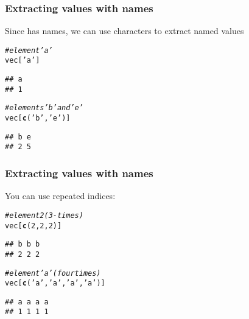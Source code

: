 \documentclass[12pt]{beamer}\usepackage[]{graphicx}\usepackage[]{color}
\makeatletter
\newcommand{\hlnum}[1]{\textcolor[rgb]{0.686,0.059,0.569}{#1}}%
\newcommand{\hlstr}[1]{\textcolor[rgb]{0.192,0.494,0.8}{#1}}%
\newcommand{\hlcom}[1]{\textcolor[rgb]{0.678,0.584,0.686}{\textit{#1}}}%
\newcommand{\hlstd}[1]{\textcolor[rgb]{0.345,0.345,0.345}{#1}}%
\newcommand{\hlkwd}[1]{\textcolor[rgb]{0.737,0.353,0.396}{\textbf{#1}}}%
\newenvironment{kframe}{%
 \def\at@end@of@kframe{}%
 \ifinner\ifhmode%
  \def\at@end@of@kframe{\end{minipage}}%
  \begin{minipage}{\columnwidth}%
 \fi\fi%
 \def\FrameCommand##1{\hskip\@totalleftmargin \hskip-\fboxsep
 \colorbox{shadecolor}{##1}\hskip-\fboxsep
     \hskip-\linewidth \hskip-\@totalleftmargin \hskip\columnwidth}%
 \MakeFramed {\advance\hsize-\width
   \@totalleftmargin\z@ \linewidth\hsize
   \@setminipage}}%
 {\par\unskip\endMakeFramed%
 \at@end@of@kframe}
\newenvironment{knitrout}{}{} %
\makeatother
\begin{document}

\begin{frame}[fragile]
\frametitle{Extracting values with names}

Since  has names, we can use characters to extract named values
\begin{knitrout}\footnotesize
{}\color{fgcolor}\begin{kframe}
\begin{alltt}
\hlcom{# element 'a'}
\hlstd{vec[}\hlstr{'a'}\hlstd{]}
\end{alltt}
\begin{verbatim}
## a 
## 1
\end{verbatim}
\begin{alltt}
\hlcom{# elements 'b' and 'e'}
\hlstd{vec[}\hlkwd{c}\hlstd{(}\hlstr{'b'}\hlstd{,} \hlstr{'e'}\hlstd{)]}
\end{alltt}
\begin{verbatim}
## b e 
## 2 5
\end{verbatim}
\end{kframe}
\end{knitrout}

\end{frame}


\begin{frame}[fragile]
\frametitle{Extracting values with names}

You can use repeated indices:
\begin{knitrout}\footnotesize
{}\color{fgcolor}\begin{kframe}
\begin{alltt}
\hlcom{# element 2 (3-times)}
\hlstd{vec[}\hlkwd{c}\hlstd{(}\hlnum{2}\hlstd{,} \hlnum{2}\hlstd{,} \hlnum{2}\hlstd{)]}
\end{alltt}
\begin{verbatim}
## b b b 
## 2 2 2
\end{verbatim}
\begin{alltt}
\hlcom{# element 'a' (four times)}
\hlstd{vec[}\hlkwd{c}\hlstd{(}\hlstr{'a'}\hlstd{,} \hlstr{'a'}\hlstd{,} \hlstr{'a'}\hlstd{,} \hlstr{'a'}\hlstd{)]}
\end{alltt}
\begin{verbatim}
## a a a a 
## 1 1 1 1
\end{verbatim}
\end{kframe}
\end{knitrout}

\end{frame}
\end{document}
